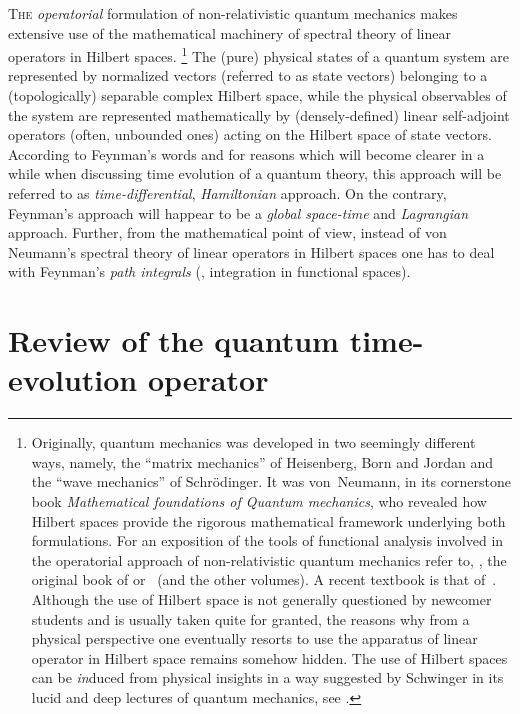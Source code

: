 \lettrine{T}{he} \emph{operatorial} formulation of non-relativistic quantum
mechanics makes extensive use of the mathematical machinery of spectral theory of
linear operators in Hilbert spaces.%
\footnote{%
   Originally, quantum mechanics was developed in two seemingly different ways,
   namely, the ``matrix mechanics'' of Heisenberg, Born and Jordan and the
   ``wave mechanics'' of Schr\"odinger. It was von~Neumann, in its cornerstone
   book \emph{Mathematical foundations of Quantum mechanics}, who revealed
   how
   Hilbert spaces provide the rigorous mathematical 
   framework underlying both formulations. For an exposition of the 
   tools of functional analysis involved in the operatorial approach of
   non-relativistic quantum mechanics refer to,
   \eg, the original book of \textcite{Neumann:1955} or~\textcite{Reed.Simon:1980}
   (and the other volumes). A recent textbook is that of~\textcite{Teschl:2009}.
   Although the use of Hilbert space is not generally questioned by newcomer
   students
   and is usually taken quite for granted, the reasons why from a physical perspective 
   one eventually resorts to use the apparatus of linear operator in Hilbert space remains
   somehow
   hidden.
   The use of Hilbert spaces can be \emph{in}duced from physical insights
   in a way suggested by
 Schwinger in its 
 lucid and deep lectures of quantum mechanics, see \textcite{Schwinger:2001}.}
The (pure) physical states of a quantum system are represented by normalized
vectors (referred to as state vectors) belonging to a (topologically) separable
 complex Hilbert
space, while the physical observables of the system are represented mathematically by
(densely-defined) linear self-adjoint operators (often, unbounded ones) acting on the Hilbert space of state vectors.
According to Feynman's words and for reasons which will become clearer in a
while when discussing time evolution of a quantum theory, this approach will be referred to as \emph{time-differential},
\emph{Hamiltonian} approach. On the contrary, Feynman's approach will happear to
be a \emph{global space-time} and \emph{Lagrangian} approach. Further, from the
mathematical point of view, instead of von Neumann's spectral theory of linear
operators in Hilbert spaces one has to deal with
Feynman's \emph{path integrals} (\ie, integration in functional spaces).

\section{Review of the quantum time-evolution operator}

